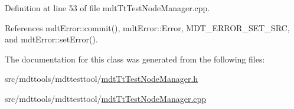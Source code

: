 Definition at line 53 of file mdt\-Tt\-Test\-Node\-Manager.\-cpp.



References mdt\-Error\-::commit(), mdt\-Error\-::\-Error, M\-D\-T\-\_\-\-E\-R\-R\-O\-R\-\_\-\-S\-E\-T\-\_\-\-S\-R\-C, and mdt\-Error\-::set\-Error().



The documentation for this class was generated from the following files\-:\begin{DoxyCompactItemize}
\item 
src/mdttools/mdttesttool/\hyperlink{mdt_tt_test_node_manager_8h}{mdt\-Tt\-Test\-Node\-Manager.\-h}\item 
src/mdttools/mdttesttool/\hyperlink{mdt_tt_test_node_manager_8cpp}{mdt\-Tt\-Test\-Node\-Manager.\-cpp}\end{DoxyCompactItemize}
